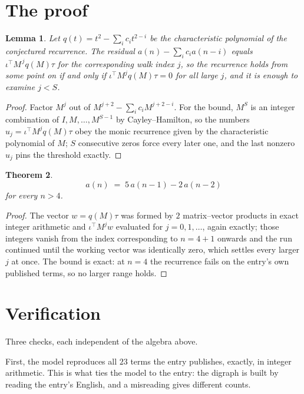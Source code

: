 \documentclass[11pt,a4paper]{article}
\theoremstyle{plain}
\newtheorem{theorem}{Theorem}
\newtheorem{lemma}[theorem]{Lemma}
\theoremstyle{definition}
\begin{document}
\section{The proof}

\begin{lemma}\label{lem:crit}
Let $q(t)=t^{2}-\sum_i c_it^{2-i}$ be the characteristic polynomial of the
conjectured recurrence. The residual $a(n)-\sum_ic_ia(n-i)$ equals
$\iota^{\!\top}M^{\,j}q(M)\tau$ for the corresponding walk index $j$, so the recurrence
holds from some point on if and only if $\iota^{\!\top}M^{j}q(M)\tau=0$ for all large $j$,
and it is enough to examine $j<S$.
\end{lemma}

\begin{proof}
Factor $M^{j}$ out of $M^{j+2}-\sum_ic_iM^{j+2-i}$. For the bound, $M^{S}$
is an integer combination of $I,M,\dots,M^{S-1}$ by Cayley--Hamilton, so the numbers
$u_j=\iota^{\!\top}M^{j}q(M)\tau$ obey the monic recurrence given by the characteristic
polynomial of $M$; $S$ consecutive zeros force every later one, and the last nonzero $u_j$
pins the threshold exactly.
\end{proof}

\begin{theorem}
\[
a(n)\;=\;5\,a(n-1) - 2\,a(n-2)
\]
for every $n>4$.
\end{theorem}

\begin{proof}
The vector $w=q(M)\tau$ was formed by $2$ matrix--vector products in exact integer
arithmetic and $\iota^{\!\top}M^{j}w$ evaluated for $j=0,1,\dots$, again exactly; those
integers vanish from the index corresponding to $n=4+1$ onwards and the run continued
until the working vector was identically zero, which settles every larger $j$ at once. The bound is exact: at $n=4$ the recurrence fails on the entry's own published terms, so no larger range holds.
\end{proof}

\section{Verification}

Three checks, each independent of the algebra above.

First, the model reproduces all $23$ terms the entry publishes, exactly, in integer
arithmetic. This is what ties the model to the entry: the digraph is built by reading the
entry's English, and a misreading gives different counts.
\end{document}
